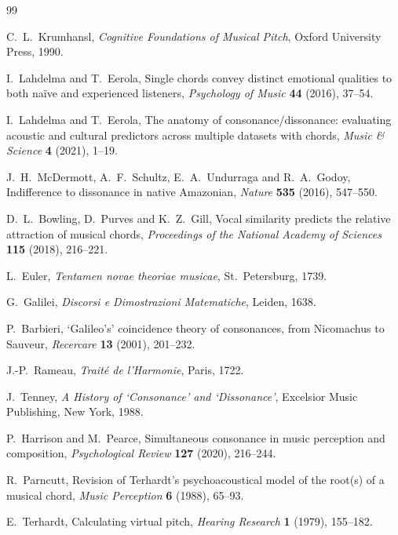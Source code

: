 \documentclass[11pt,a4paper]{article}
\begin{document}

\begin{thebibliography}{99}

C.~L.~Krumhansl,
\emph{Cognitive Foundations of Musical Pitch},
Oxford University Press, 1990.

I.~Lahdelma and T.~Eerola,
Single chords convey distinct emotional qualities to both na\"{i}ve and
experienced listeners,
\emph{Psychology of Music} \textbf{44} (2016), 37--54.

I.~Lahdelma and T.~Eerola,
The anatomy of consonance/dissonance: evaluating acoustic and cultural
predictors across multiple datasets with chords,
\emph{Music \& Science} \textbf{4} (2021), 1--19.

J.~H.~McDermott, A.~F.~Schultz, E.~A.~Undurraga and R.~A.~Godoy,
Indifference to dissonance in native Amazonian,
\emph{Nature} \textbf{535} (2016), 547--550.

D.~L.~Bowling, D.~Purves and K.~Z.~Gill,
Vocal similarity predicts the relative attraction of musical chords,
\emph{Proceedings of the National Academy of Sciences} \textbf{115} (2018),
216--221.

L.~Euler,
\emph{Tentamen novae theoriae musicae},
St.\ Petersburg, 1739.

G.~Galilei,
\emph{Discorsi e Dimostrazioni Matematiche},
Leiden, 1638.

P.~Barbieri,
`{G}alileo's' coincidence theory of consonances, from {N}icomachus to {S}auveur,
\emph{Recercare} \textbf{13} (2001), 201--232.

J.-P.~Rameau,
\emph{Trait\'{e} de l'Harmonie},
Paris, 1722.

J.~Tenney,
\emph{A History of `Consonance' and `Dissonance'},
Excelsior Music Publishing, New York, 1988.

P.~Harrison and M.~Pearce,
Simultaneous consonance in music perception and composition,
\emph{Psychological Review} \textbf{127} (2020), 216--244.

R.~Parncutt,
Revision of Terhardt's psychoacoustical model of the root(s) of a musical
chord,
\emph{Music Perception} \textbf{6} (1988), 65--93.

E.~Terhardt,
Calculating virtual pitch,
\emph{Hearing Research} \textbf{1} (1979), 155--182.


\end{thebibliography}
\end{document}
